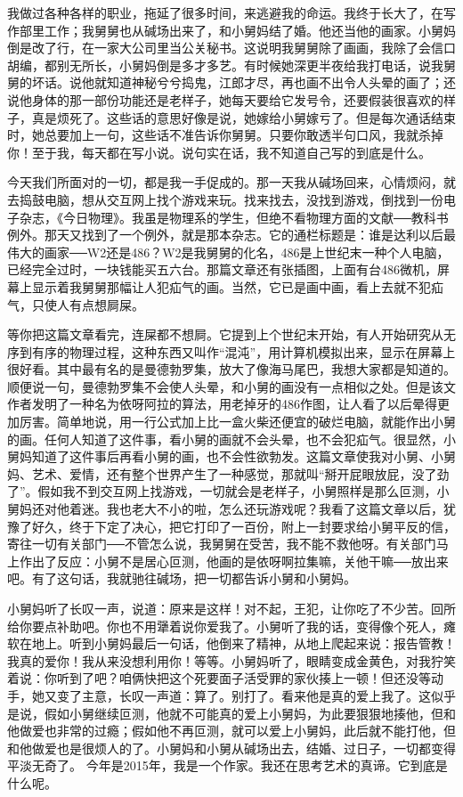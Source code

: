 我做过各种各样的职业，拖延了很多时间，来逃避我的命运。我终于长大了，在写作部里工作；我舅舅也从碱场出来了，和小舅妈结了婚。他还当他的画家。小舅妈倒是改了行，在一家大公司里当公关秘书。这说明我舅舅除了画画，我除了会信口胡编，都别无所长，小舅妈倒是多才多艺。有时候她深更半夜给我打电话，说我舅舅的坏话。说他就知道神秘兮兮捣鬼，江郎才尽，再也画不出令人头晕的画了；还说他身体的那一部份功能还是老样子，她每天要给它发号令，还要假装很喜欢的样子，真是烦死了。这些话的意思好像是说，她嫁给小舅嫁亏了。但是每次通话结束时，她总要加上一句，这些话不准告诉你舅舅。只要你敢透半句口风，我就杀掉你！至于我，每天都在写小说。说句实在话，我不知道自己写的到底是什么。 

今天我们所面对的一切，都是我一手促成的。那一天我从碱场回来，心情烦闷，就去捣鼓电脑，想从交互网上找个游戏来玩。找来找去，没找到游戏，倒找到一份电子杂志，《今日物理》。我虽是物理系的学生，但绝不看物理方面的文献──教科书例外。那天又找到了一个例外，就是那本杂志。它的通栏标题是：谁是达利以后最伟大的画家──W2还是486？W2是我舅舅的化名，486是上世纪末一种个人电脑，已经完全过时，一块钱能买五六台。那篇文章还有张插图，上面有台486微机，屏幕上显示着我舅舅那幅让人犯疝气的画。当然，它已是画中画，看上去就不犯疝气，只使人有点想屙屎。 

等你把这篇文章看完，连屎都不想屙。它提到上个世纪末开始，有人开始研究从无序到有序的物理过程，这种东西又叫作“混沌”，用计算机模拟出来，显示在屏幕上很好看。其中最有名的是曼德勃罗集，放大了像海马尾巴，我想大家都是知道的。顺便说一句，曼德勃罗集不会使人头晕，和小舅的画没有一点相似之处。但是该文作者发明了一种名为依呀阿拉的算法，用老掉牙的486作图，让人看了以后晕得更加厉害。简单地说，用一行公式加上比一盒火柴还便宜的破烂电脑，就能作出小舅的画。任何人知道了这件事，看小舅的画就不会头晕，也不会犯疝气。很显然，小舅妈知道了这件事后再看小舅的画，也不会性欲勃发。这篇文章使我对小舅、小舅妈、艺术、爱情，还有整个世界产生了一种感觉，那就叫“掰开屁眼放屁，没了劲了”。假如我不到交互网上找游戏，一切就会是老样子，小舅照样是那么叵测，小舅妈还对他着迷。我也老大不小的啦，怎么还玩游戏呢？我看了这篇文章以后，犹豫了好久，终于下定了决心，把它打印了一百份，附上一封要求给小舅平反的信，寄往一切有关部门──不管怎么说，我舅舅在受苦，我不能不救他呀。有关部门马上作出了反应：小舅不是居心叵测，他画的是依呀啊拉集嘛，关他干嘛──放出来吧。有了这句话，我就驰往碱场，把一切都告诉小舅和小舅妈。 

小舅妈听了长叹一声，说道：原来是这样！对不起，王犯，让你吃了不少苦。回所给你要点补助吧。你也不用犟着说你爱我了。小舅听了我的话，变得像个死人，瘫软在地上。听到小舅妈最后一句话，他倒来了精神，从地上爬起来说：报告管教！我真的爱你！我从来没想利用你！等等。小舅妈听了，眼睛变成金黄色，对我狞笑着说：你听到了吧？咱俩快把这个死要面子活受罪的家伙揍上一顿！但还没等动手，她又变了主意，长叹一声道：算了。别打了。看来他是真的爱上我了。这似乎是说，假如小舅继续叵测，他就不可能真的爱上小舅妈，为此要狠狠地揍他，但和他做爱也非常的过瘾；假如他不再叵测，就可以爱上小舅妈，此后就不能打他，但和他做爱也是很烦人的了。小舅妈和小舅从碱场出去，结婚、过日子，一切都变得平淡无奇了。 今年是2015年，我是一个作家。我还在思考艺术的真谛。它到底是什么呢。
